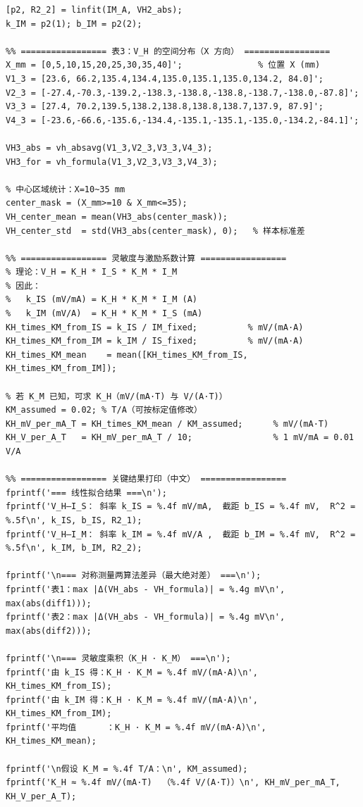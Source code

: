 ﻿\documentclass[12pt,a4paper]{article}
\begin{document}
\begin{lstlisting}[style=Matlab-boxed,caption={霍尔效应数据处理代码}]
% 线性拟合：V_H = k_IM * I_M + b_IM
[p2, R2_2] = linfit(IM_A, VH2_abs);
k_IM = p2(1); b_IM = p2(2);

%% ================= 表3：V_H 的空间分布（X 方向） =================
X_mm = [0,5,10,15,20,25,30,35,40]';               % 位置 X (mm)
V1_3 = [23.6, 66.2,135.4,134.4,135.0,135.1,135.0,134.2, 84.0]';
V2_3 = [-27.4,-70.3,-139.2,-138.3,-138.8,-138.8,-138.7,-138.0,-87.8]';
V3_3 = [27.4, 70.2,139.5,138.2,138.8,138.8,138.7,137.9, 87.9]';
V4_3 = [-23.6,-66.6,-135.6,-134.4,-135.1,-135.1,-135.0,-134.2,-84.1]';

VH3_abs = vh_absavg(V1_3,V2_3,V3_3,V4_3);
VH3_for = vh_formula(V1_3,V2_3,V3_3,V4_3);

% 中心区域统计：X=10~35 mm
center_mask = (X_mm>=10 & X_mm<=35);
VH_center_mean = mean(VH3_abs(center_mask));
VH_center_std  = std(VH3_abs(center_mask), 0);   % 样本标准差

%% ================= 灵敏度与激励系数计算 =================
% 理论：V_H = K_H * I_S * K_M * I_M
% 因此：
%   k_IS (mV/mA) = K_H * K_M * I_M (A)
%   k_IM (mV/A)  = K_H * K_M * I_S (mA)
KH_times_KM_from_IS = k_IS / IM_fixed;          % mV/(mA·A)
KH_times_KM_from_IM = k_IM / IS_fixed;          % mV/(mA·A)
KH_times_KM_mean    = mean([KH_times_KM_from_IS, KH_times_KM_from_IM]);

% 若 K_M 已知，可求 K_H（mV/(mA·T) 与 V/(A·T)）
KM_assumed = 0.02; % T/A（可按标定值修改）
KH_mV_per_mA_T = KH_times_KM_mean / KM_assumed;      % mV/(mA·T)
KH_V_per_A_T   = KH_mV_per_mA_T / 10;                % 1 mV/mA = 0.01 V/A

%% ================= 关键结果打印（中文） =================
fprintf('=== 线性拟合结果 ===\n');
fprintf('V_H–I_S： 斜率 k_IS = %.4f mV/mA,  截距 b_IS = %.4f mV,  R^2 = %.5f\n', k_IS, b_IS, R2_1);
fprintf('V_H–I_M： 斜率 k_IM = %.4f mV/A ,  截距 b_IM = %.4f mV,  R^2 = %.5f\n', k_IM, b_IM, R2_2);

fprintf('\n=== 对称测量两算法差异（最大绝对差） ===\n');
fprintf('表1：max |Δ(VH_abs - VH_formula)| = %.4g mV\n', max(abs(diff1)));
fprintf('表2：max |Δ(VH_abs - VH_formula)| = %.4g mV\n', max(abs(diff2)));

fprintf('\n=== 灵敏度乘积（K_H · K_M） ===\n');
fprintf('由 k_IS 得：K_H · K_M = %.4f mV/(mA·A)\n', KH_times_KM_from_IS);
fprintf('由 k_IM 得：K_H · K_M = %.4f mV/(mA·A)\n', KH_times_KM_from_IM);
fprintf('平均值      ：K_H · K_M = %.4f mV/(mA·A)\n', KH_times_KM_mean);

fprintf('\n假设 K_M = %.4f T/A：\n', KM_assumed);
fprintf('K_H ≈ %.4f mV/(mA·T)  （%.4f V/(A·T)）\n', KH_mV_per_mA_T, KH_V_per_A_T);


\end{lstlisting}
\end{document}
